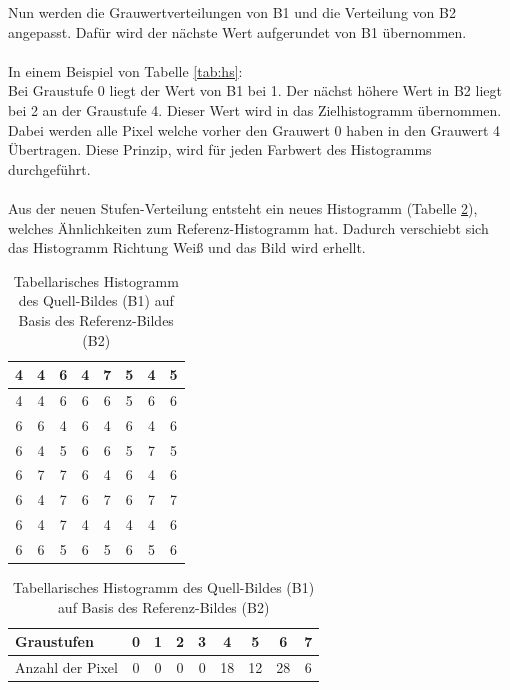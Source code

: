 Nun werden die Grauwertverteilungen von B1 und die Verteilung von B2 angepasst. Dafür wird der nächste Wert aufgerundet von B1 übernommen.\\\\
In einem Beispiel von Tabelle \ref{tab:hs}: \\
Bei Graustufe 0 liegt der Wert von B1 bei 1. Der nächst höhere Wert in B2 liegt bei 2 an der Graustufe 4. Dieser Wert wird in das Zielhistogramm übernommen. Dabei werden alle Pixel welche vorher den Grauwert 0 haben in den Grauwert 4 Übertragen. Diese Prinzip, wird für jeden Farbwert des Histogramms durchgeführt.\\\\
Aus der neuen Stufen-Verteilung entsteht ein neues Histogramm (Tabelle \ref{tab:B3}), welches Ähnlichkeiten zum Referenz-Histogramm hat. Dadurch verschiebt sich das Histogramm Richtung Weiß und das Bild wird erhellt.
  \begin{table}
  [h]
  \caption{Tabellarisches Histogramm des Quell-Bildes (B1) auf Basis des Referenz-Bildes (B2)}
  \label{tab:B3}
  \centering
  \begin{minipage}{\textwidth}
  \center
  \begin{tabular}{|c|c|c|c|c|c|c|c|}
  \hline
  4&4&6&4&7&5&4&5\\
  \hline
  4&4&6&6&6&5&6&6\\
  \hline
  6&6&4&6&4&6&4&6\\
  \hline
  6&4&5&6&6&5&7&5\\
  \hline
  6&7&7&6&4&6&4&6\\
  \hline
  6&4&7&6&7&6&7&7\\
  \hline
  6&4&7&4&4&4&4&6\\
  \hline
  6&6&5&6&5&6&5&6\\
  \hline
  \end{tabular}
  \end{minipage}
  \begin{minipage}{\textwidth}
  \hspace{\textwidth}
  \end{minipage}
  \begin{minipage}{\textwidth}
  \center
  \begin{tabular}{|l|c|c|c|c|c|c|c|c|}
  \hline
  Graustufen & 0 & 1 & 2 & 3 & 4 & 5 & 6 & 7\\
  \hline
  Anzahl der Pixel & 0 & 0 & 0 & 0 & 18 & 12 & 28 & 6\\
  \hline
  \end{tabular}
  \end{minipage}
  \end{table}